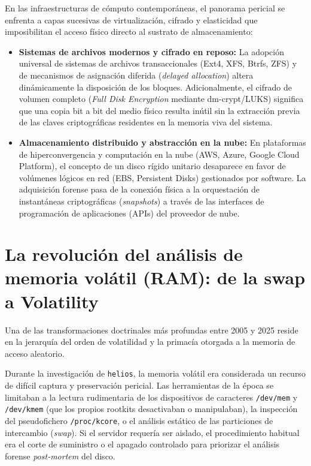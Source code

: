 En las infraestructuras de cómputo contemporáneas, el panorama pericial se enfrenta a capas sucesivas de virtualización, cifrado y elasticidad que imposibilitan el acceso físico directo al sustrato de almacenamiento:
\begin{itemize}
    \item \textbf{Sistemas de archivos modernos y cifrado en reposo:} La adopción universal de sistemas de archivos transaccionales (Ext4, XFS, Btrfs, ZFS) y de mecanismos de asignación diferida (\textit{delayed allocation}) altera dinámicamente la disposición de los bloques. Adicionalmente, el cifrado de volumen completo (\textit{Full Disk Encryption} mediante dm-crypt/LUKS) significa que una copia bit a bit del medio físico resulta inútil sin la extracción previa de las claves criptográficas residentes en la memoria viva del sistema.
    \item \textbf{Almacenamiento distribuido y abstracción en la nube:} En plataformas de hiperconvergencia y computación en la nube (AWS, Azure, Google Cloud Platform), el concepto de un disco rígido unitario desaparece en favor de volúmenes lógicos en red (EBS, Persistent Disks) gestionados por software. La adquisición forense pasa de la conexión física a la orquestación de instantáneas criptográficas (\textit{snapshots}) a través de las interfaces de programación de aplicaciones (APIs) del proveedor de nube.
\end{itemize}

\section{La revolución del análisis de memoria volátil (RAM): de la swap a Volatility}

Una de las transformaciones doctrinales más profundas entre 2005 y 2025 reside en la jerarquía del orden de volatilidad y la primacía otorgada a la memoria de acceso aleatorio.

Durante la investigación de \texttt{helios}, la memoria volátil era considerada un recurso de difícil captura y preservación pericial. Las herramientas de la época se limitaban a la lectura rudimentaria de los dispositivos de caracteres \texttt{/dev/mem} y \texttt{/dev/kmem} (que los propios rootkits desactivaban o manipulaban), la inspección del pseudofichero \texttt{/proc/kcore}, o el análisis estático de las particiones de intercambio (\textit{swap}). Si el servidor requería ser aislado, el procedimiento habitual era el corte de suministro o el apagado controlado para priorizar el análisis forense \textit{post-mortem} del disco.


